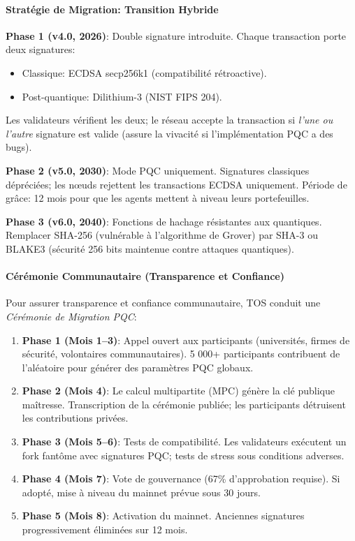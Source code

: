 \documentclass[11pt]{article}
\begin{document}
\paragraph{Stratégie de Migration: Transition Hybride}
\textbf{Phase 1 (v4.0, 2026)}: Double signature introduite. Chaque transaction porte deux signatures:
\begin{itemize}[noitemsep]
  \item Classique: ECDSA secp256k1 (compatibilité rétroactive).
  \item Post-quantique: Dilithium-3 (NIST FIPS 204).
\end{itemize}
Les validateurs vérifient les deux; le réseau accepte la transaction si \emph{l'une ou l'autre} signature est valide (assure la vivacité si l'implémentation PQC a des bugs).

\textbf{Phase 2 (v5.0, 2030)}: Mode PQC uniquement. Signatures classiques dépréciées; les nœuds rejettent les transactions ECDSA uniquement. Période de grâce: 12 mois pour que les agents mettent à niveau leurs portefeuilles.

\textbf{Phase 3 (v6.0, 2040)}: Fonctions de hachage résistantes aux quantiques. Remplacer SHA-256 (vulnérable à l'algorithme de Grover) par SHA-3 ou BLAKE3 (sécurité 256 bits maintenue contre attaques quantiques).

\paragraph{Cérémonie Communautaire (Transparence et Confiance)}
Pour assurer transparence et confiance communautaire, TOS conduit une \emph{Cérémonie de Migration PQC}:
\begin{enumerate}[noitemsep]
  \item \textbf{Phase 1 (Mois 1--3)}: Appel ouvert aux participants (universités, firmes de sécurité, volontaires communautaires). 5 000+ participants contribuent de l'aléatoire pour générer des paramètres PQC globaux.
  \item \textbf{Phase 2 (Mois 4)}: Le calcul multipartite (MPC) génère la clé publique maîtresse. Transcription de la cérémonie publiée; les participants détruisent les contributions privées.
  \item \textbf{Phase 3 (Mois 5--6)}: Tests de compatibilité. Les validateurs exécutent un fork fantôme avec signatures PQC; tests de stress sous conditions adverses.
  \item \textbf{Phase 4 (Mois 7)}: Vote de gouvernance (67\% d'approbation requise). Si adopté, mise à niveau du mainnet prévue sous 30 jours.
  \item \textbf{Phase 5 (Mois 8)}: Activation du mainnet. Anciennes signatures progressivement éliminées sur 12 mois.
\end{enumerate}
\end{document}
